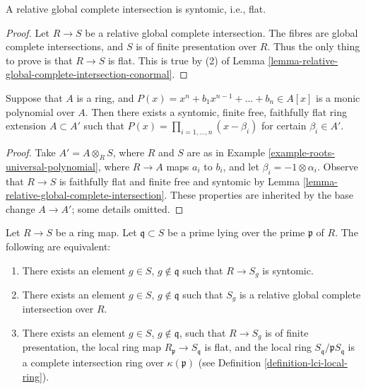 \begin{lemma}
\label{lemma-relative-global-complete-intersection}
A relative global complete intersection is syntomic, i.e., flat.
\end{lemma}

\begin{proof}
Let $R \to S$ be a relative global complete intersection.
The fibres are global complete intersections, and
$S$ is of finite presentation over $R$.
Thus the only thing to prove is that $R \to S$ is flat.
This is true by (2) of
Lemma \ref{lemma-relative-global-complete-intersection-conormal}.
\end{proof}

\begin{lemma}
\label{lemma-adjoin-roots}
Suppose that $A$ is a ring, and
$P(x) = x^n + b_1 x^{n-1} + \ldots + b_n \in A[x]$ is
a monic polynomial over $A$. Then there exists a
syntomic, finite free, faithfully flat ring extension
$A \subset A'$ such that $P(x) = \prod_{i = 1, \ldots, n} (x - \beta_i)$
for certain $\beta_i \in A'$.
\end{lemma}

\begin{proof}
Take $A' = A \otimes_R S$, where $R$ and $S$ are as in
Example \ref{example-roots-universal-polynomial},
where $R \to A$ maps $a_i$ to $b_i$, and let
$\beta_i = -1 \otimes \alpha_i$. Observe that $R \to S$ is
faithfully flat and finite free and syntomic by
Lemma \ref{lemma-relative-global-complete-intersection}.
These properties are inherited by the base change
$A \to A'$; some details omitted.
\end{proof}

\begin{lemma}
\label{lemma-syntomic}
Let $R \to S$ be a ring map.
Let $\mathfrak q \subset S$ be a prime lying over
the prime $\mathfrak p$ of $R$.
The following are equivalent:
\begin{enumerate}
\item There exists an element $g \in S$, $g \not \in \mathfrak q$ such that
$R \to S_g$ is syntomic.
\item There exists an element $g \in S$, $g \not \in \mathfrak q$
such that $S_g$ is a relative global complete intersection over $R$.
\item There exists an element $g \in S$, $g \not \in \mathfrak q$,
such that $R \to S_g$ is of finite presentation,
the local ring map $R_{\mathfrak p} \to S_{\mathfrak q}$ is flat, and
the local ring $S_{\mathfrak q}/\mathfrak pS_{\mathfrak q}$ is
a complete intersection ring over $\kappa(\mathfrak p)$ (see
Definition \ref{definition-lci-local-ring}).
\end{enumerate}
\end{lemma}

